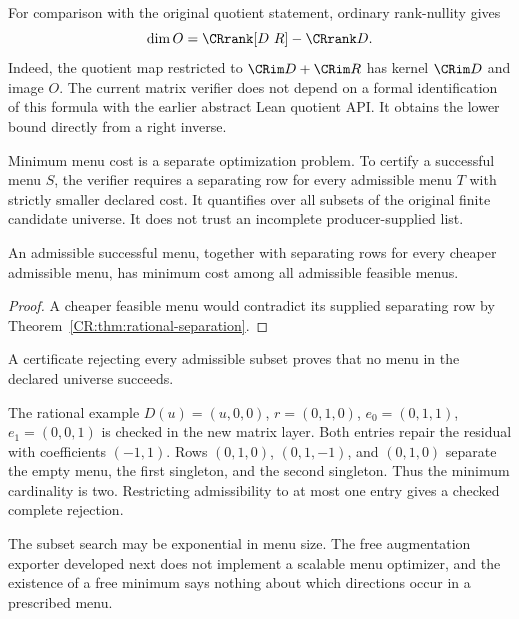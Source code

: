 For comparison with the original quotient statement, ordinary rank-nullity gives
\begin{equation}\label{CR:eq:rank-difference-new}
 \dim O=\CRrank[D\ R]-\CRrank D.
\end{equation}
Indeed, the quotient map restricted to $\CRim D+\CRim R$ has kernel $\CRim D$ and image $O$. The current matrix verifier does not depend on a formal identification of this formula with the earlier abstract Lean quotient API. It obtains the lower bound directly from a right inverse.

Minimum menu cost is a separate optimization problem. To certify a successful menu $S$, the verifier requires a separating row for every admissible menu $T$ with strictly smaller declared cost. It quantifies over all subsets of the original finite candidate universe. It does not trust an incomplete producer-supplied list.

\begin{CRtheorem}
An admissible successful menu, together with separating rows for every cheaper admissible menu, has minimum cost among all admissible feasible menus.
\end{CRtheorem}
\begin{proof}
A cheaper feasible menu would contradict its supplied separating row by Theorem~\ref{CR:thm:rational-separation}.
\end{proof}

A certificate rejecting every admissible subset proves that no menu in the declared universe succeeds.

The rational example $D(u)=(u,0,0)$, $r=(0,1,0)$, $e_0=(0,1,1)$, $e_1=(0,0,1)$ is checked in the new matrix layer. Both entries repair the residual with coefficients $(-1,1)$. Rows $(0,1,0)$, $(0,1,-1)$, and $(0,1,0)$ separate the empty menu, the first singleton, and the second singleton. Thus the minimum cardinality is two. Restricting admissibility to at most one entry gives a checked complete rejection.

The subset search may be exponential in menu size. The free augmentation exporter developed next does not implement a scalable menu optimizer, and the existence of a free minimum says nothing about which directions occur in a prescribed menu.


